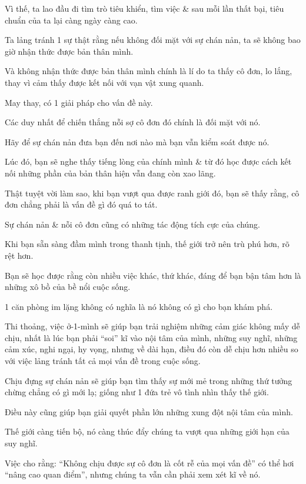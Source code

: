 \documentclass{article}
\begin{document}
Vì thế, ta lao đầu đi tìm trò tiêu khiển, tìm việc \& sau mỗi lần thất bại, tiêu chuẩn của ta lại càng ngày càng cao.

Ta lảng tránh 1 sự thật rằng nếu không đối mặt với sự chán nản, ta sẽ không bao giờ nhận thức được bản thân mình.

Và không nhận thức được bản thân mình chính là lí do ta thấy cô đơn, lo lắng, thay vì cảm thấy được kết nối với vạn vật xung quanh.

%
May thay, có 1 giải pháp cho vấn đề này.

Các duy nhất để chiến thắng nỗi sợ cô đơn đó chính là đối mặt với nó.

Hãy để sự chán nản đưa bạn đến nơi nào mà bạn vẫn kiểm soát được nó.

Lúc đó, bạn sẽ nghe thấy tiếng lòng của chính mình \& từ đó học được cách kết nối những phần của bản thân hiện vẫn đang còn xao lãng.

%
Thật tuyệt vời làm sao, khi bạn vượt qua được ranh giới đó, bạn sẽ thấy rằng, cô đơn chẳng phải là vấn đề gì đó quá to tát.

Sự chán nản \& nỗi cô đơn cũng có những tác động tích cực của chúng.

Khi bạn sẵn sàng đầm mình trong thanh tịnh, thế giới trở nên trù phú hơn, rõ rệt hơn.

%
Bạn sẽ học được rằng còn nhiều việc khác, thứ khác, đáng để bạn bận tâm hơn là những xô bồ của bề nổi cuộc sống.

1 căn phòng im lặng không có nghĩa là nó không có gì cho bạn khám phá.

%
Thi thoảng, việc ở-1-mình sẽ giúp bạn trải nghiệm những cảm giác không mấy dễ chịu, nhất là lúc bạn phải ``soi'' kĩ vào nội tâm của mình, những suy nghĩ, những cảm xúc, nghi ngại, hy vọng, nhưng về dài hạn, điều đó còn dễ chịu hơn nhiều so với việc lảng tránh tất cả mọi vấn đề trong cuộc sống.

%
Chịu đựng sự chán nản sẽ giúp bạn tìm thấy sự mới mẻ trong những thứ tưởng chừng chẳng có gì mới lạ; giống như 1 đứa trẻ vô tình nhìn thấy thế giới.

Điều này cũng giúp bạn giải quyết phần lớn những xung đột nội tâm của mình.

%
Thế giới càng tiến bộ, nó càng thúc đẩy chúng ta vượt qua những giới hạn của suy nghĩ.

Việc cho rằng: ``Không chịu được sự cô đơn là cốt rễ của mọi vấn đề'' có thể hơi ``nâng cao quan điểm'', nhưng chúng ta vẫn cần phải xem xét kĩ về nó.
\end{document}
